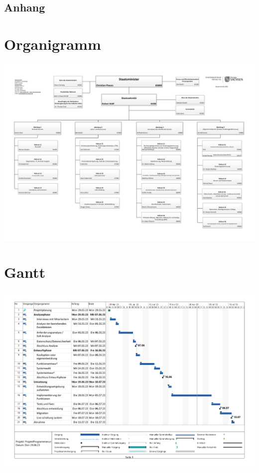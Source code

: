 \subsection*{Anhang}
\label{anhang}
\appendix
\section{Organigramm}
\label{abb:Organigramm}
\includegraphics[angle=90, page=1,height=0.90\textheight, keepaspectratio]{anhang/abb/21_01_06_Organigramm_SMK.pdf}

\section{Gantt}
\label{abb:Gantt}
\includegraphics[angle=90, page=1,height=0.90\textheight, keepaspectratio]{anhang/abb/ProjektProgrammierungZeitplan.pdf}

